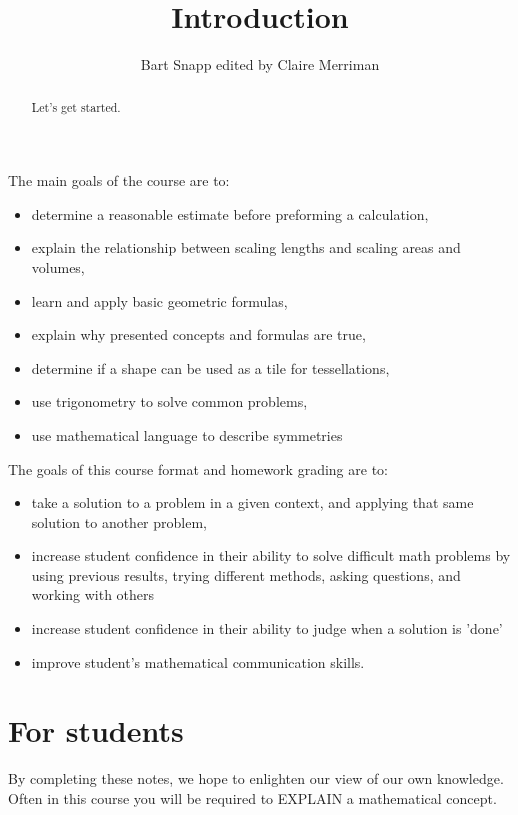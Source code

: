 \documentclass[handout,numbers,nooutcomes,hints]{../ximera}
\title{Introduction}
\author{Bart Snapp edited by Claire Merriman}
\begin{document}
\begin{abstract}
  Let's get started.
\end{abstract}
\maketitle

\begin{mdframed}[style=OutcomeStyle]


{\large The main goals of the course are to:}
\begin{itemize}
\item determine a reasonable estimate before preforming a calculation,
\item explain the relationship between scaling lengths and scaling areas and volumes,
\item learn and apply basic geometric formulas,
\item explain why presented concepts and formulas are true,
\item determine if a shape can be used as a tile for tessellations,
\item use trigonometry to solve common problems,
\item use mathematical language to describe symmetries
\end{itemize}

{\large The goals of this course format and homework grading are to:}
\begin{itemize}
\item take a solution to a problem in a given context, and applying that same solution to another problem,
\item increase student confidence in their ability to solve difficult math problems by using previous results, trying different methods, asking questions, and working with others
\item increase student confidence in their ability to judge when a solution is  'done'
\item improve student's mathematical communication skills.
\end{itemize}
\end{mdframed}






\section*{For students}




By completing these notes, we hope to enlighten our view of
our own knowledge.  Often in this course you will be required to
EXPLAIN a mathematical concept.
\end{document}
